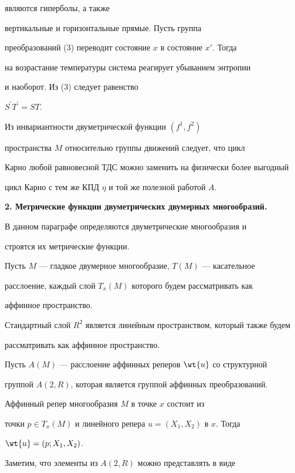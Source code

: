 являются гиперболы, а также


вертикальные и горизонтальные прямые. Пусть группа


преобразований (3) переводит состояние $x$ в состояние $x'$. Тогда


на возрастание температуры система реагирует убыванием энтропии


и наоборот. Из (3) следует равенство


$S^{\prime}T^{\prime}=ST$.





Из инвариантности двуметрической функции $(f^1,f^2)$


пространства $M$ относительно группы движений следует, что цикл


Карно любой равновесной ТДС можно заменить на физически более выгодный


цикл Карно с тем же КПД $\eta$ и той же полезной работой $A$.


\medskip








{\bf 2. Метрические функции двуметрических двумерных многообразий.}


В данном параграфе определяются двуметрические многообразия и


строятся их метрические функции.





Пусть $M$ --- гладкое двумерное многообразие, $T(M)$ --- касательное


расслоение, каждый слой $T_x(M)$ которого будем рассматривать как


аффинное пространство.


Стандартный слой $R^2$ является линейным пространством, который также будем


рассматривать как аффинное пространство. 


Пусть $A(M)$ --- расслоение аффинных реперов $\wt{u}$ со структурной


группой $A(2,R)$, которая является группой аффинных преобразований.


Аффинный репер многообразия $M$ в точке $x$ состоит из


точки $p \in T_x(M)$ и линейного репера $u=(X_1,X_2)$ в $x$. Тогда


$\wt{u}=(p;X_1,X_2)$.


Заметим, что элементы из $A(2,R)$ можно представлять в виде



